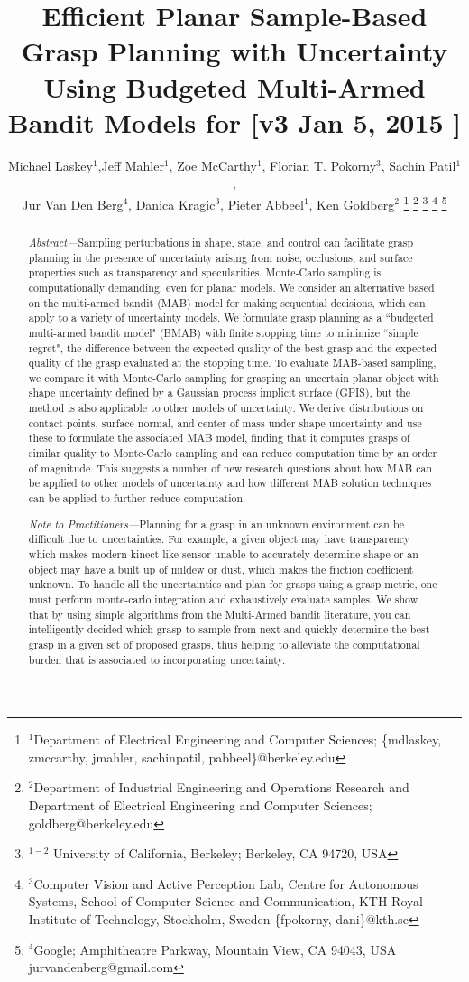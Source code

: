 \documentclass[journal,transmag]{IEEEtran}%
\title{\LARGE \bf
Efficient Planar Sample-Based Grasp Planning with Uncertainty Using Budgeted Multi-Armed Bandit Models for  [v3 Jan 5, 2015 ] }
\author{Michael Laskey$^1$,Jeff Mahler$^1$, Zoe McCarthy$^1$,  Florian T. Pokorny$^3$, Sachin Patil$^1$,\\ Jur Van Den Berg$^4$,  Danica Kragic$^3$, Pieter Abbeel$^1$, Ken Goldberg$^2$%
\thanks{$^1$Department of Electrical Engineering and Computer Sciences; {\small \{mdlaskey, zmccarthy, jmahler, sachinpatil, pabbeel\}@berkeley.edu}}%
\thanks{$^2$Department of Industrial Engineering and Operations Research and Department of Electrical Engineering and Computer Sciences; {\small goldberg@berkeley.edu}}%
\thanks{$^{1-2}$ University of California, Berkeley;  Berkeley, CA 94720, USA}%
\thanks{$^3$Computer Vision and Active Perception Lab, Centre for Autonomous Systems, School of Computer Science and Communication, KTH Royal Institute of Technology, Stockholm, Sweden {\small \{fpokorny, dani\}@kth.se}}%
\thanks{$^4$Google; Amphitheatre Parkway, Mountain View, CA 94043, USA {\small jurvandenberg@gmail.com}}%
}
\begin{document}
\maketitle
\thispagestyle{empty}
\pagestyle{empty}



\begin{abstract}
\textit{Abstract---}Sampling perturbations in shape, state, and control can facilitate grasp planning in the presence of uncertainty arising from noise, occlusions, and surface properties such as transparency and specularities.  Monte-Carlo sampling is computationally demanding, even for planar models. We consider an alternative based on the multi-armed bandit (MAB) model for making sequential decisions, which can apply to a variety of uncertainty models.  We formulate grasp planning as a ``budgeted multi-armed bandit model" (BMAB) with finite stopping time to minimize ``simple regret", the difference between the expected quality of the best grasp and the expected quality of the grasp evaluated at the stopping time.  To evaluate MAB-based sampling, we compare it with Monte-Carlo sampling for grasping an uncertain planar object with shape uncertainty defined by a Gaussian process implicit surface (GPIS), but the method is also applicable to other models of uncertainty.  We derive distributions on contact points, surface normal, and center of mass under shape uncertainty and use these to formulate the associated MAB model, finding that it computes grasps of similar quality to Monte-Carlo sampling and can reduce computation time by an order of magnitude.  This suggests a number of new research questions about how MAB can be applied to other models of uncertainty and how different MAB solution techniques can be applied to further reduce computation.
\end{abstract}

\begin{abstract}
\textit{Note to Practitioners---}Planning for a grasp in an unknown environment can be difficult due to uncertainties. For example, a given object may have transparency which makes modern kinect-like sensor unable to accurately determine shape or an object may have a built up of mildew or dust, which makes the friction coefficient unknown. To handle all the uncertainties and plan for grasps using a grasp metric, one must perform monte-carlo integration and exhaustively evaluate samples. We show that by using simple algorithms from the Multi-Armed bandit literature, you can intelligently decided which grasp to sample from next and quickly determine the best grasp in a given set of proposed grasps, thus helping to alleviate the computational burden that is associated to incorporating uncertainty. 
\end{abstract}
\end{document}
